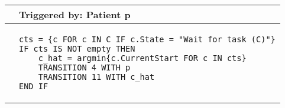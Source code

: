 \begin{tabular}{@{}>{\raggedright\arraybackslash}p{0.25cm}>{\raggedright\arraybackslash}p{13cm}@{}}
  \toprule
   & Triggered by: Patient p\\ \midrule 
  &
\vspace{-12pt}
\begin{lstlisting}[language=CMPseudo]
cts = {c FOR c IN C IF c.State = "Wait for task (C)"}
IF cts IS NOT empty THEN 
    c_hat = argmin{c.CurrentStart FOR c IN cts}
    TRANSITION 4 WITH p
    TRANSITION 11 WITH c_hat
END IF
  \end{lstlisting}
  \\ \bottomrule
  \end{tabular}
